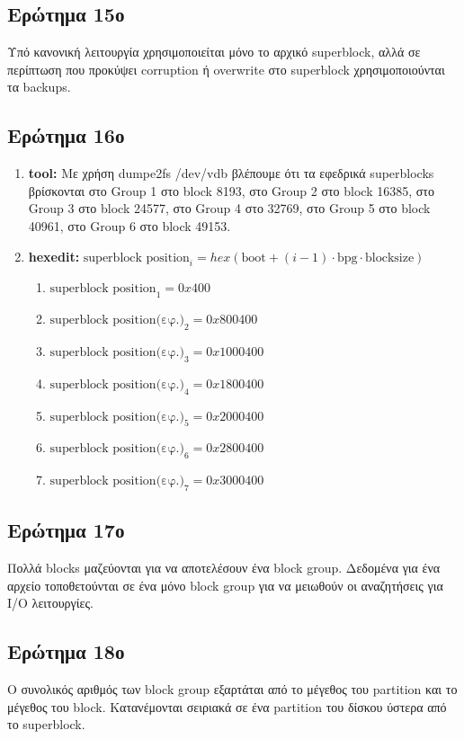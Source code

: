 \documentclass{article}
\begin{document}
\subsection{Ερώτημα 15ο}
Υπό κανονική λειτουργία χρησιμοποιείται μόνο το αρχικό superblock, αλλά σε περίπτωση που προκύψει corruption ή 
overwrite στο superblock χρησιμοποιούνται τα backups.\\

\subsection{Ερώτημα 16ο}
\begin{enumerate}
    \item{\textbf{tool:} Με χρήση dumpe2fs /dev/vdb βλέπουμε ότι τα εφεδρικά superblocks βρίσκονται στο Group 1 
        στο block 8193, στο Group 2 στο block 16385, στο Group 3 στο block 24577, στο Group 4 στο 32769, στο Group
        5 στο block 40961, στο Group 6 στο block 49153.}
    \item{\textbf{hexedit:} $\text{superblock position}_{i} = hex(\text{boot}+(i-1)\cdot\text{bpg}\cdot \text{blocksize})$
        \begin{enumerate}
            \item{$\text{superblock position}_{1} = 0x400$}
            \item{$\text{superblock position(εφ.)}_{2} = 0x800400$}
            \item{$\text{superblock position(εφ.)}_{3} = 0x1000400$}
            \item{$\text{superblock position(εφ.)}_{4} = 0x1800400$}
            \item{$\text{superblock position(εφ.)}_{5} = 0x2000400$}
            \item{$\text{superblock position(εφ.)}_{6} = 0x2800400$}
            \item{$\text{superblock position(εφ.)}_{7} = 0x3000400$}
        \end{enumerate}}
\end{enumerate}

\subsection{Ερώτημα 17ο}
Πολλά blocks μαζεύονται για να αποτελέσουν ένα block group. Δεδομένα για ένα αρχείο τοποθετούνται σε 
ένα μόνο block group για να μειωθούν οι αναζητήσεις για I/O λειτουργίες.\\

\subsection{Ερώτημα 18ο}
Ο συνολικός αριθμός των block group εξαρτάται από το μέγεθος του partition και το μέγεθος του block. 
Κατανέμονται σειριακά σε ένα partition του δίσκου ύστερα από το superblock.\\
\end{document}
